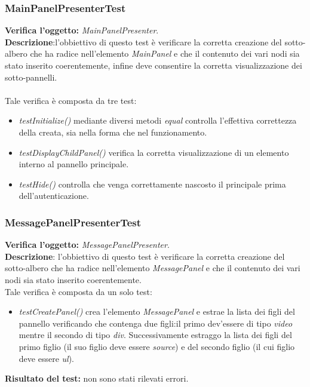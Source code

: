 \subsubsection{MainPanelPresenterTest}
\textbf{Verifica l'oggetto:} \textit{MainPanelPresenter}.\\
\textbf{Descrizione}:l'obbiettivo di questo test è verificare la corretta creazione del sotto-albero che ha radice nell'elemento \textit{MainPanel} e che il contenuto dei vari nodi sia stato inserito coerentemente, infine deve consentire la corretta visualizzazione dei sotto-pannelli.\\\\
Tale verifica è composta da tre test:
\begin{itemize}
\item \textit{testInitialize() } mediante diversi metodi \textit{equal} controlla l'effettiva correttezza della  creata, sia nella forma che nel funzionamento.
\item \textit{testDisplayChildPanel() } verifica la corretta visualizzazione di un elemento interno al pannello principale.
\item \textit{testHide() } controlla che venga correttamente nascosto il  principale prima dell'autenticazione.
\end{itemize}

\subsubsection{MessagePanelPresenterTest}
\textbf{Verifica l'oggetto:} \textit{MessagePanelPresenter}.\\
\textbf{Descrizione}: l'obbiettivo di questo test è verificare la corretta creazione del sotto-albero che ha radice nell'elemento \textit{MessagePanel} e che il contenuto dei vari nodi sia stato inserito coerentemente.\\
Tale verifica è composta da un solo test:
\begin{itemize}
\item \textit{testCreatePanel()} crea l'elemento \textit{MessagePanel} e estrae la lista dei figli del pannello verificando che contenga due figli:il primo dev'essere di tipo \textit{video} mentre il secondo di tipo \textit{div}.
Successivamente estraggo la lista dei figli del primo figlio (il suo figlio deve essere \textit{source}) e del secondo figlio (il cui figlio deve essere \textit{ul}).
\end{itemize}
\textbf{Risultato del test:} non sono stati rilevati errori.

